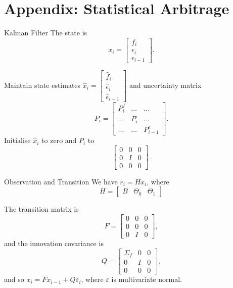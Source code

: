 \documentclass{beamer}
\begin{document}
\section{Appendix: Statistical Arbitrage}
\begin{frame}{Kalman Filter}
	The state is
	$$x_i = \left[\begin{matrix}f_i \\ \epsilon_i \\ \epsilon_{i-1}\end{matrix}\right].$$

	Maintain state estimates $\hat{x}_i = \left[\begin{matrix}\hat{f}_i \\ \hat{\epsilon}_i \\ \hat{\epsilon}_{i-1}\end{matrix}\right]$ and uncertainty matrix
	$$P_i = \left[\begin{matrix}P^f_i&\ldots&\ldots\\\ldots&P^\epsilon_i&\ldots\\\ldots&\ldots&P^\epsilon_{i-1}\end{matrix}\right].$$
	Initialise $\hat{x}_i$ to zero and $P_i$ to 
	$$\left[\begin{matrix}0 & 0 & 0 \\ 0 & I & 0 \\ 0 & 0 & 0\end{matrix}\right].$$
\end{frame}

\begin{frame}{Observation and Transition}
	We have $r_i = Hx_i$, where
	$$H = \left[\begin{matrix}B & \Theta_0 & \Theta_1\end{matrix}\right]$$

	The transition matrix is
	$$F = \left[\begin{matrix}0 & 0 & 0 \\ 0 & 0 & 0 \\ 0 & I & 0\end{matrix}\right],$$
	and the innovation covariance is
	$$Q = \left[\begin{matrix}\Sigma_f & 0 & 0 \\ 0 & I & 0 \\ 0 & 0 & 0\end{matrix}\right],$$
	and so $x_i = Fx_{i-1} + Q\varepsilon_i$, where $\varepsilon$ is multivariate normal.
\end{frame}
\end{document}
